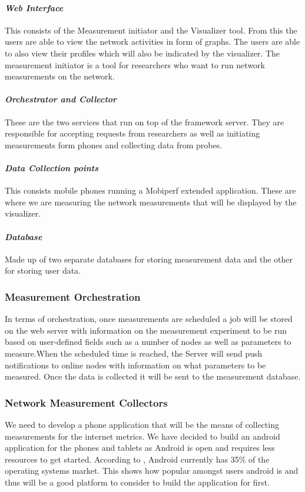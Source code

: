 \paragraph{\textit{Web Interface}}
This consists of the Measurement initiator and the Visualizer tool. From this the users are able to view the network activities in form of graphs. The users are able to also view their profiles which will also be indicated by the visualizer. The measurement initiator is a tool for researchers who want to run network measurements on the network.

\paragraph{\textit{Orchestrator and Collector}}
These are the two services that run on top of the framework server. They are responsible for accepting requests from researchers as well as initiating measurements form phones and collecting data from probes.

\paragraph{\textit{Data Collection points}} This consists mobile phones running a Mobiperf extended application. These are where we are measuring the network measurements that will be displayed by the visualizer.
\paragraph{\textit{Database}} Made up of two separate databases for storing measurement data and the other for storing user data.
\subsubsection{Measurement Orchestration}
In terms of orchestration, once measurements are scheduled a job will be stored on the web server with information on the measurement experiment to be run based on user-defined fields such as a number of nodes as well as parameters to measure.When the scheduled time is reached, the Server will send push notifications to online nodes with information on what parameters to be measured. Once the data is collected it will be sent to the measurement database.
\subsubsection{Network Measurement Collectors}
We need to develop a phone application that will be the means of collecting measurements for the internet metrics. We have decided to build an android application for the phones and tablets as Android is open and requires less resources to get started. According to \cite{statcounter_global_stats}, Android currently has 35\% of the operating systems market. This shows how popular amongst users android is and thus will be a good platform to consider to build the application for first. 
